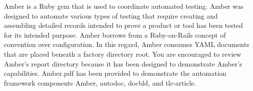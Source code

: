 Amber is a Ruby gem that is used to coordinate automated testing. Amber was
designed to automate various types of testing that require creating and
assembling detailed records intended to prove a product or tool has been tested
for its intended purpose. Amber borrows from a Ruby-on-Rails concept of
convention over configuration. In this regard, Amber consumes YAML documents
that are placed beneath a factory directory root. You are encouraged to review
Amber's report directory because it has been designed to demonstrate Amber's
capabilities. Amber.pdf has been provided to demonstrate the automation
framework components Amber, autodoc, docbld, and tlc-article.
